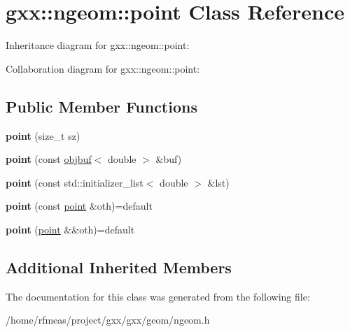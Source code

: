 \hypertarget{classgxx_1_1ngeom_1_1point}{}\section{gxx\+:\+:ngeom\+:\+:point Class Reference}
\label{classgxx_1_1ngeom_1_1point}


Inheritance diagram for gxx\+:\+:ngeom\+:\+:point\+:


Collaboration diagram for gxx\+:\+:ngeom\+:\+:point\+:
\subsection*{Public Member Functions}
\begin{DoxyCompactItemize}
\item 
{\bfseries point} (size\+\_\+t sz)\hypertarget{classgxx_1_1ngeom_1_1point_a8ffb9866ad23a050bfecebb4cfcf7dc0}{}\label{classgxx_1_1ngeom_1_1point_a8ffb9866ad23a050bfecebb4cfcf7dc0}

\item 
{\bfseries point} (const \hyperlink{classgxx_1_1object__buffer}{objbuf}$<$ double $>$ \&buf)\hypertarget{classgxx_1_1ngeom_1_1point_add7397d994402da5670e8717c496f00f}{}\label{classgxx_1_1ngeom_1_1point_add7397d994402da5670e8717c496f00f}

\item 
{\bfseries point} (const std\+::initializer\+\_\+list$<$ double $>$ \&lst)\hypertarget{classgxx_1_1ngeom_1_1point_a04a1dad37c8033c46b54973e42e61ad3}{}\label{classgxx_1_1ngeom_1_1point_a04a1dad37c8033c46b54973e42e61ad3}

\item 
{\bfseries point} (const \hyperlink{classgxx_1_1ngeom_1_1point}{point} \&oth)=default\hypertarget{classgxx_1_1ngeom_1_1point_acecd973fac576f91d5fa923d9b2ccb45}{}\label{classgxx_1_1ngeom_1_1point_acecd973fac576f91d5fa923d9b2ccb45}

\item 
{\bfseries point} (\hyperlink{classgxx_1_1ngeom_1_1point}{point} \&\&oth)=default\hypertarget{classgxx_1_1ngeom_1_1point_ace5c7f030015b4b3cb8ce33e563f26bc}{}\label{classgxx_1_1ngeom_1_1point_ace5c7f030015b4b3cb8ce33e563f26bc}

\end{DoxyCompactItemize}
\subsection*{Additional Inherited Members}


The documentation for this class was generated from the following file\+:\begin{DoxyCompactItemize}
\item 
/home/rfmeas/project/gxx/gxx/geom/ngeom.\+h\end{DoxyCompactItemize}
